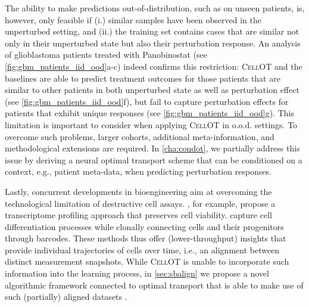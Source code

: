 The ability to make predictions out-of-distribution, such as on unseen patients, is, however, only feasible if (i.) similar samples have been observed in the unperturbed setting, and (ii.) the training set contains cases that are similar not only in their unperturbed state but also their perturbation response.
An analysis of glioblastoma patients treated with Panobinostat \citep{zhao2021deconvolution} (see \cref{fig:gbm_patients_iid_ood}a-c) indeed confirms this restriction:
\textsc{CellOT} and the baselines are able to predict treatment outcomes for those patients that are similar to other patients in both unperturbed state as well as perturbation effect (see \cref{fig:gbm_patients_iid_ood}f), but fail to capture perturbation effects for patients that exhibit unique responses (see \cref{fig:gbm_patients_iid_ood}g).
This limitation is important to consider when applying \textsc{CellOT} in o.o.d. settings. To overcome such problems, 
larger cohorts, additional meta-information, and methodological extensions are required. In \cref{cha:condot}, we partially address this issue by deriving a neural optimal transport scheme that can be conditioned on a context, e.g., patient meta-data, when predicting perturbation responses.

\smallskip

Lastly, concurrent developments in bioengineering aim at overcoming the technological limitation of destructive cell assays. \citet{chen2022live}, for example, propose a transcriptome profiling approach that preserves cell viability. \citet{weinreb2020lineage} capture cell differentiation processes while clonally connecting cells and their progenitors through barcodes. These methods thus offer (lower-throughput) insights that provide individual trajectories of cells over time, i.e., an alignment between distinct measurement snapshots.
While \textsc{CellOT} is unable to incorporate such information into the learning process, in \cref{sec:sbalign} we propose a novel algorithmic framework connected to optimal transport that is able to make use of such (partially) aligned datasets \citep{shi2023diffusion, tong2023conditional, somnath2023aligned}. 
